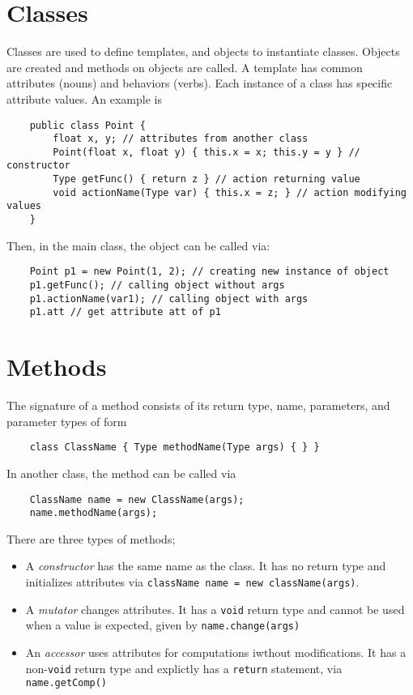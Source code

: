 \documentclass[letterpaper, openany, justified]{tufte-book}
\newcommand{\cd}[1]{\lstinline{#1}}
\begin{document}
\begin{fullwidth}
\section{Classes}

Classes are used to define templates, and objects to instantiate classes. Objects are created and methods on objects are called. A template has common attributes (nouns) and behaviors (verbs). Each instance of a class has specific attribute values. An example is
\begin{lstlisting}
    public class Point {
        float x, y; // attributes from another class
        Point(float x, float y) { this.x = x; this.y = y } // constructor
        Type getFunc() { return z } // action returning value
        void actionName(Type var) { this.x = z; } // action modifying values
    }
\end{lstlisting}
Then, in the main class, the object can be called via:
\begin{lstlisting}
    Point p1 = new Point(1, 2); // creating new instance of object
    p1.getFunc(); // calling object without args
    p1.actionName(var1); // calling object with args
    p1.att // get attribute att of p1
\end{lstlisting}

\section{Methods}
The signature of a method consists of its return type, name, parameters, and parameter types of form
\begin{lstlisting}
    class ClassName { Type methodName(Type args) { } }
\end{lstlisting}
In another class, the method can be called via
\begin{lstlisting}
    ClassName name = new ClassName(args);
    name.methodName(args);
\end{lstlisting}
There are three types of methods;
\begin{itemize}
    \item A \emph{constructor} has the same name as the class. It has no return type and initializes attributes via \cd{className name = new className(args)}.
    \item A \emph{mutator} changes attributes. It has a \cd{void} return type and cannot be used when a value is expected, given by \cd{name.change(args)}
    \item An \emph{accessor} uses attributes for computations iwthout modifications. It has a non-\cd{void} return type and explictly has a \cd{return} statement, via \cd{name.getComp()}
\end{itemize}


\end{fullwidth}
\end{document}
